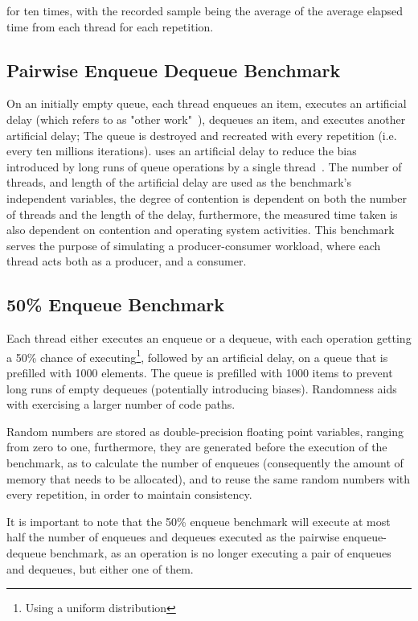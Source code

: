 for ten times, with the recorded sample being the average of the average
elapsed time from each thread for each repetition.

\subsection{Pairwise Enqueue Dequeue Benchmark}

On an initially empty queue, each thread enqueues an item, executes an
artificial delay (which \citeauthor{michael1996simple} refers to as "other
work"~\citep{michael1996simple}), dequeues an item, and executes another
artificial delay; The queue is destroyed and recreated with every repetition
(i.e. every ten millions iterations). \citeauthor{michael1996simple} uses an
artificial delay to reduce the bias introduced by long runs of queue operations
by a single thread~\citep{michael1996simple}. The number of threads, and length
of the artificial delay are used as the benchmark's independent variables, the
degree of contention is dependent on both the number of threads and the length
of the delay, furthermore, the measured time taken is also dependent on
contention and operating system activities. This benchmark serves the purpose
of simulating a producer-consumer workload, where each thread acts both as a
producer, and a consumer.

\subsection{50\% Enqueue Benchmark}
Each thread either executes an enqueue or a dequeue, with each operation
getting a 50\% chance of executing\footnote{Using a uniform distribution},
followed by an artificial delay, on a queue that is prefilled with 1000
elements. The queue is prefilled with 1000 items to prevent long runs of empty
dequeues (potentially introducing biases). Randomness aids with exercising a
larger number of code paths.

Random numbers are stored as double-precision floating point variables, ranging
from zero to one, furthermore, they are generated before the execution
of the benchmark, as to calculate the number of enqueues (consequently the
amount of memory that needs to be allocated), and to reuse the same random
numbers with every repetition, in order to maintain consistency. 

It is important to note that the 50\% enqueue benchmark will execute at most
half the number of enqueues and dequeues executed as the pairwise
enqueue-dequeue benchmark, as an operation is no longer executing a pair of
enqueues and dequeues, but either one of them.

